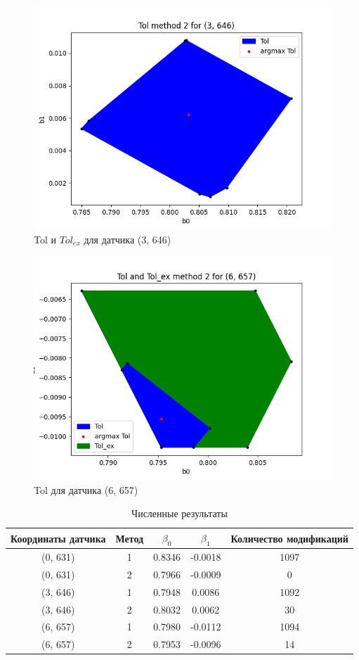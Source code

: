 \begin{figure}[H]
    \centering
    \includegraphics[width=0.7\linewidth]{image/3_646_method_2.png}
    \caption{Tol и $Tol_{ex}$ для датчика (3, 646)}
    \label{fig:3_646_tol}
\end{figure}

\begin{figure}[H]
    \centering
    \includegraphics[width=0.7\linewidth]{image/6_657_method_2.png}
    \caption{Tol для датчика (6, 657)}
    \label{fig:6_657_tol}
\end{figure}

\begin{table}[H]
    \centering
    \begin{tabular}{|c|c|c|c|c|}
        \hline
         Координаты датчика &  Метод &  $\beta_0$ & $\beta_1$ & Количество модификаций\\ \hline
         (0, 631) & 1 & 0.8346 & -0.0018 & 1097 \\ \hline
         (0, 631) & 2 & 0.7966 & -0.0009 & 0 \\ \hline
         (3, 646) & 1 & 0.7948 & 0.0086 & 1092 \\ \hline
         (3, 646) & 2 & 0.8032 & 0.0062 & 30 \\ \hline
         (6, 657) & 1 & 0.7980 & -0.0112 & 1094 \\ \hline
         (6, 657) & 2 & 0.7953 & -0.0096 & 14 \\ \hline
    \end{tabular}
    \caption{Численные результаты}
    \label{tab:results}
\end{table}

